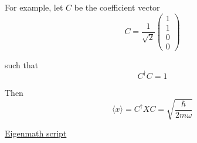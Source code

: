 For example, let $C$ be the coefficient vector
\begin{equation*}
C=\frac{1}{\sqrt2}\begin{pmatrix}1\\1\\0\\0\end{pmatrix}
\end{equation*}

such that
\begin{equation*}
C^\dag C=1
\end{equation*}

Then
\begin{equation*}
\langle x\rangle=
C^\dag XC=\sqrt{\frac{\hbar}{2m\omega}}
\tag{1}
\end{equation*}

\href{https://georgeweigt.github.io/examples/harmonic-oscillator-matrix-elements-demo.html}{Eigenmath script}


